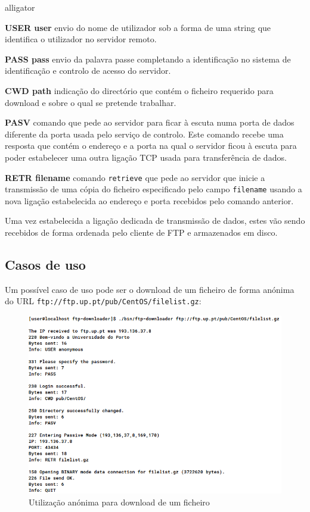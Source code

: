 \documentclass[a4paper,11pt,titlepage]{article}
\begin{document}
\begin{labeling}{alligator}
\item [\textbf{USER user}] envio do nome de utilizador sob a forma de uma string que identifica o utilizador no servidor remoto.
\item [\textbf{PASS pass}] envio da palavra passe completando a identificação no sistema de identificação e controlo de acesso do servidor.
\item [\textbf{CWD path}] indicação do directório que contém o ficheiro requerido para download e sobre o qual se pretende trabalhar.
\item [\textbf{PASV}] comando que pede ao servidor para ficar à escuta numa porta de dados diferente da porta usada pelo serviço de controlo. Este comando recebe uma resposta que contém o endereço e a porta na qual o servidor ficou à escuta para poder estabelecer uma outra ligação TCP usada para transferência de dados.
\item [\textbf{RETR filename}] comando \texttt{retrieve} que pede ao servidor que inicie a transmissão de uma cópia do ficheiro especificado pelo campo \texttt{filename} usando a nova ligação estabelecida ao endereço e porta recebidos pelo comando anterior.
\end{labeling}

Uma vez estabelecida a ligação dedicada de transmissão de dados, estes vão
sendo recebidos de forma ordenada pelo cliente de FTP e armazenados em disco.

\subsection*{Casos de uso}
Um possível caso de uso pode ser o download de um ficheiro de forma anónima do
URL \texttt{ftp://ftp.up.pt/pub/CentOS/filelist.gz}:

\begin{figure}[H]
    \center
    \includegraphics[scale=0.45]{res/anonymous.png}
    \caption{Utilização anónima para download de um ficheiro}
    \label{fig:anonymous.png}
\end{figure}
\end{document}
